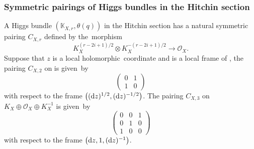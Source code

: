 \documentclass[pdftex]{sigma}
\numberwithin{equation}{section}
\newcommand{\strsheaf}{\mathcal{O}}
\begin{document}
\subsubsection{Symmetric pairings of Higgs bundles in the Hitchin section}
A Higgs bundle $(\mathbb{K}_{X,r},\theta(q))$ in the Hitchin section has a natural symmetric pairing $C_{X,r}$ defined by the~morphism
\[
K_X^{(r-2i+1)/2} \otimes K_X^{-(r-2i+1)/2} \to \mathcal{O}_X.
\]
 Suppose that $z$ is a local holomorphic~coordinate and  is a local frame of , the pairing $C_{X,2}$ on  is given~by
\begin{equation*}
 \begin{pmatrix}
 0 & 1 \\
 1 & 0
\end{pmatrix}
\end{equation*}
with respect to the frame $\bigl(({\rm d}z)^{1/2},({\rm d}z)^{-1/2}\bigr)$. The pairing $C_{X,3}$ on $K_X\oplus \strsheaf_X \oplus K_X^{-1}$ is given~by
\begin{equation*}
\begin{pmatrix}
 0 & 0 & 1 \\
 0 & 1 & 0 \\
 1 & 0 & 0
\end{pmatrix}
\end{equation*}
with respect to the frame $\bigl({\rm d}z,1,({\rm d}z)^{-1}\bigr)$.
\end{document}
